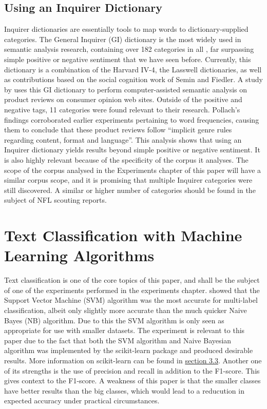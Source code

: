 \documentclass[oneside,12pt]{Classes/RoboticsLaTeX}
\begin{document}
\subsection{Using an Inquirer Dictionary}
Inquirer dictionaries are essentially tools to map words to dictionary-supplied categories. The General Inquirer (GI) dictionary is the most widely used in semantic analysis research, containing over 182 categories in all \citep{stone66}, 
far surpassing simple positive or negative sentiment that we have seen before. Currently, this dictionary is a combination of the Harvard IV-4, the Lasswell dictionaries, as well as contributions based on the social cognition work of 
Semin and Fiedler. A study by \citet{SentiGI} uses this GI dictionary to perform computer-assisted semantic analysis on product reviews on consumer opinion web sites. Outside of the positive and negative tags, 11 categories 
were found relevant to their research. Pollach's findings corroborated earlier experiments pertaining to word frequencies, causing them to conclude that these product reviews follow ``implicit genre rules regarding content, format 
and language''. This analysis shows that using an Inquirer dictionary yields results beyond simple positive or negative sentiment. It is also highly relevant because of the specificity of the corpus it analyses. The scope of the corpus analysed
in the Experiments chapter of this paper will have a similar corpus scope, and it is promising that multiple Inquirer categories were still discovered. A similar or higher number of categories should be found in the subject of NFL scouting reports.

\section{Text Classification with Machine Learning Algorithms}
Text classification is one of the core topics of this paper, and shall be the subject of one of the experiments performed in the experiments chapter. \citet{Chinese_textC} showed that the Support Vector Machine (SVM) algorithm was the most accurate for 
multi-label classification, albeit only slightly more accurate than the much quicker Naive Bayes (NB) algorithm. Due to this the SVM algorithm is only seen as appropriate for use with smaller datasets. The experiment is relevant to this paper due to the fact
that both the SVM algorithm and Naive Bayesian algorithm was implemented by the scikit-learn package and produced desirable results. More information on scikit-learn can be found in \hyperref[sec:sci-kit_label]{section 3.3}. Another one of its strengths
is the use of precision and recall in addition to the F1-score. This gives context to the F1-score. A weakness of this paper is that the smaller classes have better results than the big classes, which would lead to a reducution in expected accuracy under
practical circumstances.
\end{document}

